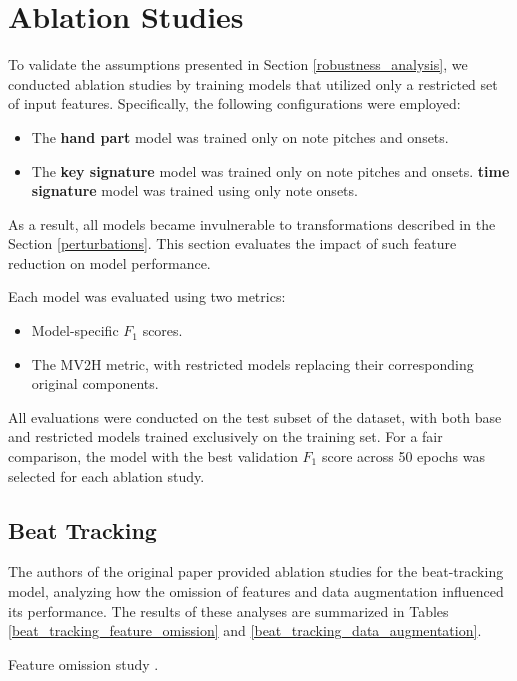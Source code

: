 \section{Ablation Studies} \label{ablation_studies}

To validate the assumptions presented in Section \ref{robustness_analysis}, we conducted ablation studies by training models that utilized only a restricted set of input features. Specifically, the following configurations were employed: \begin{itemize}
	\item The \textbf{hand part} model was trained only on note pitches and onsets.
	\item The \textbf{key signature} model was trained only on note pitches and onsets.
	\itemTThe \textbf{time signature} model was trained using only note onsets.
\end{itemize}

As a result, all models became invulnerable to transformations described in the Section \ref{perturbations}. This section evaluates the impact of such feature reduction on model performance.

Each model was evaluated using two metrics:
\begin{itemize} \item Model-specific $F_1$ scores. \item The MV2H metric, with restricted models replacing their corresponding original components. \end{itemize}

All evaluations were conducted on the test subset of the dataset, with both base and restricted models trained exclusively on the training set. For a fair comparison, the model with the best validation $F_1$ score across 50 epochs was selected for each ablation study.

\subsection{Beat Tracking} \label{beat_tracking}

The authors of the original paper provided ablation studies for the beat-tracking model, analyzing how the omission of features and data augmentation influenced its performance. The results of these analyses are summarized in Tables \ref{beat_tracking_feature_omission} and \ref{beat_tracking_data_augmentation}.

\begin{table}[ht!]
\centering

\caption[Feature omission study.]{Feature omission study \cite{Liu2022}.}
\label{beat_tracking_feature_omission}
\end{table}

